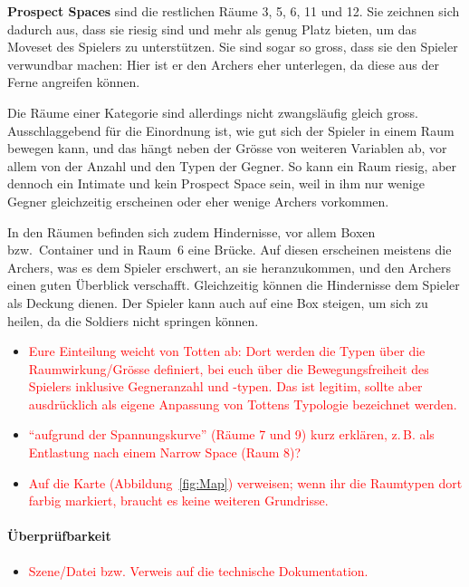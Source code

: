 \documentclass[../Main.tex]{subfiles}
\begin{document}
\textbf{Prospect Spaces} sind die restlichen Räume 3, 5, 6, 11 und 12. Sie zeichnen sich dadurch aus, dass sie riesig sind und mehr als genug Platz bieten, um das Moveset des Spielers zu unterstützen. Sie sind sogar so gross, dass sie den Spieler verwundbar machen: Hier ist er den Archers eher unterlegen, da diese aus der Ferne angreifen können.

Die Räume einer Kategorie sind allerdings nicht zwangsläufig gleich gross. Ausschlaggebend für die Einordnung ist, wie gut sich der Spieler in einem Raum bewegen kann, und das hängt neben der Grösse von weiteren Variablen ab, vor allem von der Anzahl und den Typen der Gegner. So kann ein Raum riesig, aber dennoch ein Intimate und kein Prospect Space sein, weil in ihm nur wenige Gegner gleichzeitig erscheinen oder eher wenige Archers vorkommen.

In den Räumen befinden sich zudem Hindernisse, vor allem Boxen bzw.\ Container und in Raum~6 eine Brücke. Auf diesen erscheinen meistens die Archers, was es dem Spieler erschwert, an sie heranzukommen, und den Archers einen guten Überblick verschafft. Gleichzeitig können die Hindernisse dem Spieler als Deckung dienen. Der Spieler kann auch auf eine Box steigen, um sich zu heilen, da die Soldiers nicht springen können.

\begin{itemize}[leftmargin=1.5cm]
    \item \textcolor{red}{Eure Einteilung weicht von Totten ab: Dort werden die Typen über die Raumwirkung/Grösse definiert, bei euch über die Bewegungsfreiheit des Spielers inklusive Gegneranzahl und -typen. Das ist legitim, sollte aber ausdrücklich als eigene Anpassung von Tottens Typologie bezeichnet werden.}
    \item \textcolor{red}{\enquote{aufgrund der Spannungskurve} (Räume 7 und 9) kurz erklären, z.\,B. als Entlastung nach einem Narrow Space (Raum 8)?}
    \item \textcolor{red}{Auf die Karte (Abbildung~\ref{fig:Map}) verweisen; wenn ihr die Raumtypen dort farbig markiert, braucht es keine weiteren Grundrisse.}
\end{itemize}

\paragraph{Überprüfbarkeit}
\begin{itemize}[leftmargin=1.5cm]
    \item \textcolor{red}{Szene/Datei bzw. Verweis auf die technische Dokumentation.}
\end{itemize}
\end{document}
